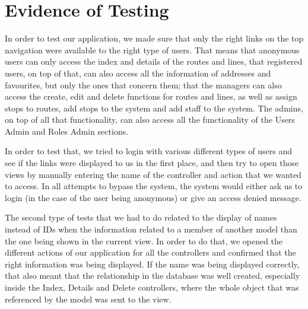 \chapter{Evidence of Testing}

In order to test our application, we made sure that only the right links
on the top navigation were available to the right type of users. That means that
anonymous users can only access the index and details of the routes and lines,
that registered users, on top of that, can also access all the information of
addresses and favourites, but only the ones that concern them; that the managers can also access the create, edit and delete functions for routes and lines, as well as assign stops to routes, add stops to the system and add staff to the system. The admins, on top of all that functionality, can also access all the functionality of the Users Admin and Roles Admin sections.

In order to test that, we tried to login with various different types of users
and see if the links were displayed to us in the first place, and then try to open those views by manually entering the name of the controller and action that
we wanted to access. In all attempts to bypass the system, the system would either
ask us to login (in the case of the user being anonymous) or give an access denied message.

The second type of tests that we had to do related to the display of names instead of IDs when the information related to a member of another model than the
one being shown in the current view. In order to do that, we opened the different actions of our application for all the controllers and confirmed that the right information was being displayed. If the name was being displayed correctly, that
also meant that the relationship in the database was well created, especially inside the Index, Details and Delete controllers, where the whole object that was referenced by the model was sent to the view.
